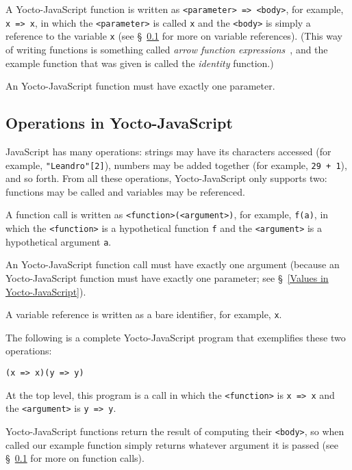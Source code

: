 \documentclass[12pt, oneside]{book}
\begin{document}
A Yocto-JavaScript function is written as \verb!<parameter> => <body>!, for example, \texttt{x => x}, in which the \verb!<parameter>! is called \texttt{x} and the \verb!<body>! is simply a reference to the variable \texttt{x} (see §~\ref{Operations in Yocto-JavaScript} for more on variable references). (This way of writing functions is something called \emph{arrow function expressions}~\cite{arrow-function-expressions}, and the example function that was given is called the \emph{identity} function.)

An Yocto-JavaScript function must have exactly one parameter.

\subsection{Operations in Yocto-JavaScript}
\label{Operations in Yocto-JavaScript}

JavaScript has many operations: strings may have its characters accessed (for example, \texttt{"Leandro"[2]}), numbers may be added together (for example, \texttt{29 + 1}), and so forth. From all these operations, Yocto-JavaScript only supports two: functions may be called and variables may be referenced.

A function call is written as \verb!<function>(<argument>)!, for example, \texttt{f(a)}, in which the \verb!<function>! is a hypothetical function \texttt{f} and the \verb!<argument>! is a hypothetical argument \texttt{a}.

An Yocto-JavaScript function call must have exactly one argument (because an Yocto-JavaScript function must have exactly one parameter; see §~\ref{Values in Yocto-JavaScript}).

A variable reference is written as a bare identifier, for example, \texttt{x}.

The following is a complete Yocto-JavaScript program that exemplifies these two operations:

\begin{verbatim}
(x => x)(y => y)
\end{verbatim}

At the top level, this program is a call in which the \texttt{<function>} is \texttt{x => x} and the \texttt{<argument>} is \texttt{y => y}.

Yocto-JavaScript functions return the result of computing their \texttt{<body>}, so when called our example function simply returns whatever argument it is passed (see §~\ref{Operations in Yocto-JavaScript} for more on function calls). 
\end{document}

